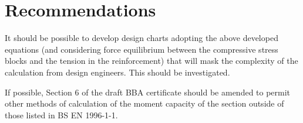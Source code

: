 \documentclass[11pt]{article}
\begin{document}
\hypertarget{recommendations}{%
\section{Recommendations}\label{recommendations}}

It should be possible to develop design charts adopting the above
developed equations (and considering force equilibrium between the
compressive stress blocks and the tension in the reinforcement) that
will mask the complexity of the calculation from design engineers. This
should be investigated.

If possible, Section 6 of the draft BBA certificate should be amended to
permit other methods of calculation of the moment capacity of the
section outside of those listed in BS EN 1996-1-1.


    
    
    
\end{document}
